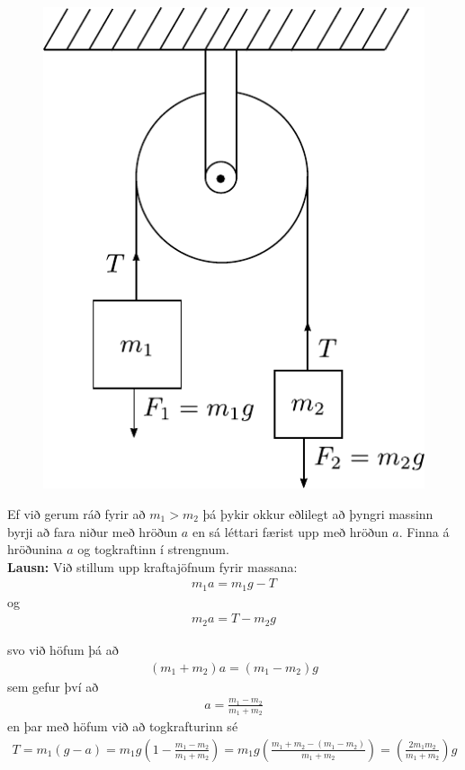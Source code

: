 \begin{figure}[H]
    \centering
    \includegraphics[scale = 0.7]{figures/atwood.pdf}
\end{figure}

Ef við gerum ráð fyrir að $m_1 > m_2$ þá þykir okkur eðlilegt að þyngri massinn byrji að fara niður með hröðun $a$ en sá léttari færist upp með hröðun $a$. Finna á hröðunina $a$ og togkraftinn í strengnum. \\

\textbf{Lausn:} Við stillum upp kraftajöfnum fyrir massana:
\begin{align*}
    m_1 a = m_1 g - T
\end{align*}
og
\begin{align*}
    m_2 a = T - m_2 g
\end{align*}

svo við höfum þá að
\begin{align*}
    (m_1 + m_2)a = (m_1 - m_2)g
\end{align*}
sem gefur því að 
\begin{align*}
    a = \frac{m_1 - m_2}{m_1 + m_2}
\end{align*}
en þar með höfum við að togkrafturinn sé
\begin{align*}
    T = m_1 (g-a) = m_1 g \left( 1-  \frac{m_1 - m_2}{m_1 + m_2} \right) = m_1 g \left( \frac{m_1 + m_2 - (m_1 - m_2)}{m_1 + m_2} \right) = \left(\frac{2m_1 m_2}{m_1 + m_2}\right) g
\end{align*}

